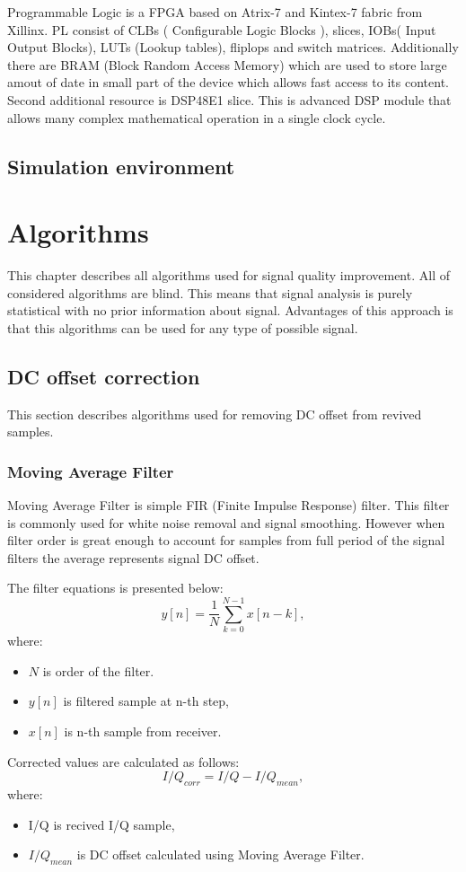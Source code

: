 \documentclass[en,printmode]{mgr}
\begin{document}
		Programmable Logic is a FPGA based on Atrix-7 and Kintex-7 fabric from Xillinx. PL consist of
		CLBs ( Configurable Logic Blocks ), slices, IOBs( Input Output Blocks), LUTs (Lookup tables),
		fliplops and switch matrices. Additionally there are BRAM (Block Random Access Memory) which
		are used to store large amout of date in small part of the device which allows fast access to
		its content. Second additional resource is DSP48E1 slice. This is advanced DSP module that
		allows many complex mathematical operation in a single clock cycle.
		
		

	\section{Simulation environment}
	
\chapter{Algorithms}
	This chapter describes all algorithms used for signal quality improvement. All of considered 
	algorithms are blind. This means that signal analysis is purely statistical with no prior 
	information about signal. Advantages of this approach is that this algorithms can be used 
	for any type of possible signal.
	\section{DC offset correction}
		This section describes algorithms used for removing DC offset from revived samples.
		\subsection*{Moving Average Filter}
			Moving Average Filter is simple FIR (Finite Impulse Response) filter. This filter is
			commonly used for white noise removal and signal smoothing. However when filter order
			is great enough to account for samples from full period of the signal filters the
			average represents signal DC offset.
			
			The filter equations is presented below:
			\[
				y[n] = \frac{1}{N} \sum_{k=0}^{N-1}x[n-k],
			\]
			where:
			\begin{itemize}
				\item   $N$ is order of the filter.
				\item	$y[n]$ is filtered sample at n-th step,
				\item   $x[n]$ is n-th sample from receiver.
			\end{itemize}
			Corrected values are calculated as follows:
			\[
				I/Q_{corr} = I/Q - I/Q_{mean},
			\]
			where:
			\begin{itemize}
				\item I/Q is recived I/Q sample,
				\item $I/Q_{mean}$ is DC offset calculated using Moving Average Filter.
			\end{itemize}
\end{document}
